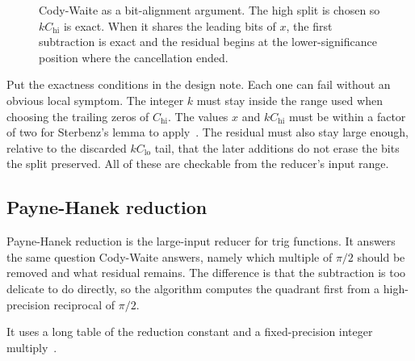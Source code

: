 \documentclass[manuscript, nonacm]{acmart}
\begin{document}
\begin{figure}[H]
        \caption{Cody-Waite as a bit-alignment argument. The high split is chosen
        so $kC_\mathrm{hi}$ is exact. When it shares the leading bits of $x$, the
        first subtraction is exact and the residual begins at the lower-significance
        position where the cancellation ended.}
        \label{fig:codywaite}
    \end{figure}

    Put the exactness conditions in the design note. Each one can fail without an
    obvious local symptom. The integer $k$ must stay inside
    the range used when choosing the trailing zeros of $C_\mathrm{hi}$. The
    values $x$ and $kC_\mathrm{hi}$ must be within a factor of two for
    Sterbenz's lemma to apply~\cite{handbook}. The residual must also stay
    large enough, relative to the discarded $kC_\mathrm{lo}$ tail, that the
    later additions do not erase the bits the split preserved. All of these
    are checkable from the reducer's input range.

    \subsection{Payne-Hanek reduction}

    Payne-Hanek reduction is the large-input reducer for trig functions. It
    answers the same question Cody-Waite answers, namely which multiple of
    $\pi/2$ should be removed and what residual remains. The difference is that
    the subtraction is too delicate to do directly, so the algorithm computes the
    quadrant first from a high-precision reciprocal of $\pi/2$.

    It uses a long table of the reduction constant and a fixed-precision integer
    multiply~\cite{muller}.
\end{document}
